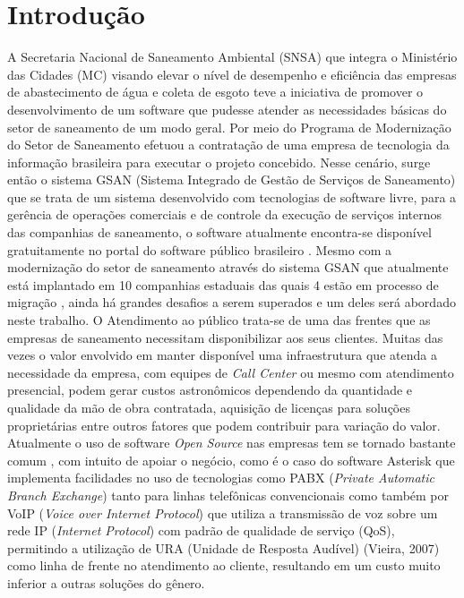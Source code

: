 \chapter[Introdução]{Introdução}

A Secretaria Nacional de Saneamento Ambiental (SNSA) que integra o Ministério das Cidades (MC) visando elevar o nível de desempenho e eficiência das empresas de abastecimento de água e coleta de esgoto teve a iniciativa de promover o desenvolvimento de um software que pudesse atender as necessidades básicas do setor de saneamento de um modo geral. Por meio do Programa de Modernização do Setor de Saneamento \cite{PMSS:2014} efetuou a contratação de uma empresa de tecnologia da informação brasileira para executar o projeto concebido.  Nesse cenário, surge então o sistema GSAN (Sistema Integrado de Gestão de Serviços de Saneamento) que se trata de um sistema desenvolvido com tecnologias de software livre, para a gerência de operações comerciais e de controle da execução de serviços internos das companhias de saneamento, o software atualmente encontra-se disponível gratuitamente no portal do software público brasileiro \cite{PORTAL:2014}. Mesmo com a modernização do setor de saneamento através do sistema GSAN que atualmente está implantado em 10 companhias estaduais das quais 4 estão em processo de migração \cite{PMSS:2014}, ainda há grandes desafios a serem superados e um deles será abordado neste trabalho.
O Atendimento ao público trata-se de uma das frentes que as empresas de saneamento necessitam disponibilizar aos seus clientes. Muitas das vezes o valor envolvido em manter disponível uma infraestrutura que atenda a necessidade da empresa, com equipes de \textit{Call Center} ou mesmo com atendimento presencial, podem gerar custos astronômicos dependendo da quantidade e qualidade da mão de obra contratada, aquisição de licenças para soluções proprietárias entre outros fatores que podem contribuir para variação do valor. Atualmente o uso de software \textit{Open Source} nas empresas tem se tornado bastante comum \cite{MEIRELLES2014}, com intuito de apoiar o negócio, como é o caso do software Asterisk que implementa facilidades no uso de tecnologias como PABX (\textit{Private Automatic Branch Exchange})  tanto para linhas telefônicas convencionais como também por VoIP (\textit{Voice over Internet Protocol}) que utiliza a transmissão de voz sobre um rede IP (\textit{Internet Protocol}) com padrão de qualidade de serviço (QoS), permitindo a utilização de URA (Unidade de Resposta Audível) (Vieira, 2007) como linha de frente no atendimento ao cliente, resultando em um custo muito inferior a outras soluções do gênero.


